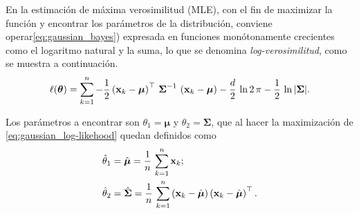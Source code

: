 En la estimación de máxima verosimilitud (MLE), con el fin de maximizar la función y encontrar los parámetros de la distribución, conviene operar\eqref{eq:gaussian_bayes}) expresada en funciones monótonamente crecientes como el logaritmo natural y la suma, lo que se denomina \emph{log-verosimilitud}, como se muestra a continuación.
%
\begin{equation}
    \label{eq:gaussian_log-likehood}
    \ell(\boldsymbol{\theta}) = \sum_{k = 1}^n - \frac{1}{2}\left(\vect{x}_k -
    \boldsymbol{\mu}\right)^\top\,\boldsymbol{\Sigma}^{-1}\,\left(\vect{x}_k - \boldsymbol{\mu}\right)
    - \frac{d}{2}\,\ln{2\,\pi} - \frac{1}{2}\,\ln{\left|\boldsymbol{\Sigma}\right|}.
\end{equation}

Los parámetros a encontrar son $\theta_1 = \boldsymbol{\mu}$ y $\theta_2 = \boldsymbol{\Sigma}$, que al hacer la maximización de \eqref{eq:gaussian_log-likehood} quedan definidos como
%
\begin{subequations}
    \begin{align}
        \hat{\theta}_1 &= \hat{\boldsymbol{\mu}} = \frac{1}{n}\,\sum_{k = 1}^n \vect{x}_k; \label{eq:gaussian_mu}\\
        \hat{\theta}_2 &= \hat{\boldsymbol{\Sigma}} =
        \frac{1}{n} \,\sum_{k = 1}^n \left(\vect{x}_k - \hat{\boldsymbol{\mu}}\right)
        \left(\vect{x}_k - \hat{\boldsymbol{\mu}}\right)^\top. \label{eq:gaussian_Sigma}
    \end{align}
\end{subequations}

